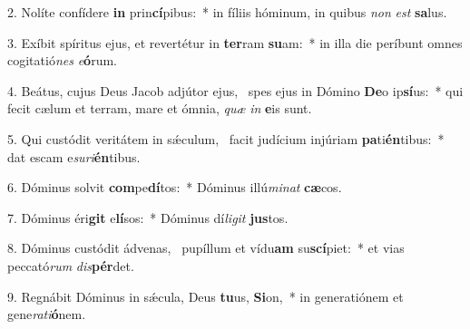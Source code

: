 2. Nolíte confídere \textbf{in} prin\textbf{cí}pibus:~*  in fíliis hóminum, in quibus \textit{non} \textit{est} \textbf{sa}lus.\

3. Exíbit spíritus ejus, et revertétur in \textbf{ter}ram \textbf{su}am:~*  in illa die períbunt omnes cogitatió\textit{nes} \textit{e}\textbf{ó}rum.\

4. Beátus, cujus Deus Jacob adjútor ejus, \dag\  spes ejus in Dómino \textbf{De}o ip\textbf{sí}us:~*  qui fecit cælum et terram, mare et ómnia, \textit{quæ} \textit{in} \textbf{e}is sunt.\

5. Qui custódit veritátem in sǽculum, \dag\  facit judícium injúriam \textbf{pa}ti\textbf{én}tibus:~*  dat escam e\textit{su}\textit{ri}\textbf{én}tibus.\

6. Dóminus solvit \textbf{com}pe\textbf{dí}tos:~*  Dóminus illú\textit{mi}\textit{nat} \textbf{cæ}cos.\

7. Dóminus éri\textbf{git} e\textbf{lí}sos:~*  Dóminus dí\textit{li}\textit{git} \textbf{jus}tos.\

8. Dóminus custódit ádvenas, \dag\  pupíllum et vídu\textbf{am} su\textbf{scí}piet:~*  et vias peccató\textit{rum} \textit{dis}\textbf{pér}det.\

9. Regnábit Dóminus in sǽcula, Deus \textbf{tu}us, \textbf{Si}on,~*  in generatiónem et gene\textit{ra}\textit{ti}\textbf{ó}nem.\

